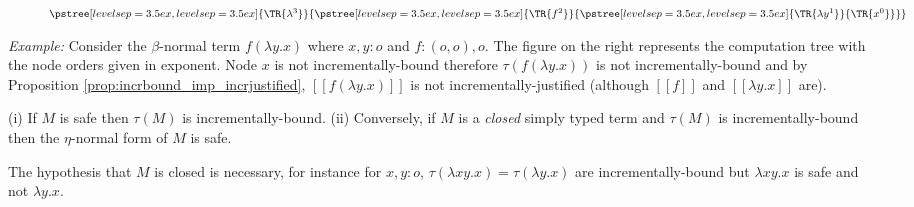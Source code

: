 \documentclass{llncs}
\newcommand{\sem}[1]{{[\![ #1 ]\!]}}
\newcommand{\tree}[2][levelsep=3.5ex]{\pstree[levelsep=3.5ex,#1]{\TR{#2}}}
\begin{document}

\begin{wrapfigure}[5]{r}{0.6cm}
$%
{\tree{\lambda^3}{\tree{f^2}{ \tree{\lambda y^1}{ \TR{x^0} }}}}$
\end{wrapfigure}
\noindent \emph{Example:} %
Consider the $\beta$-normal term $f (\lambda y .x)$ where $x,y:o$ and $f:(o,o),o$. The figure on
the right represents the computation tree with the node orders given in exponent.
Node $x$ is not incrementally-bound therefore $\tau(f (\lambda y .x))$ is not incrementally-bound and
by Proposition \ref{prop:incrbound_imp_incrjustified}, $\sem{f (\lambda
y .x)}$ is not incrementally-justified (although $\sem{f}$ and $\sem{\lambda y. x}$ are).

\begin{proposition} %
\label{prop:safe_imp_incrbound}
(i) If $M$ is safe then $\tau(M)$ is incrementally-bound.
(ii) Conversely, if $M$ is a \emph{closed} simply typed term and $\tau(M)$ is incrementally-bound then the $\eta$-normal form of $M$ is safe.
\end{proposition}

The hypothesis that $M$ is closed is necessary, for instance for $x,y:o$, $\tau(\lambda x y .x) = \tau(\lambda y . x)$
are incrementally-bound but $\lambda x y .x$ is safe and not $\lambda y . x$.
\end{document}
